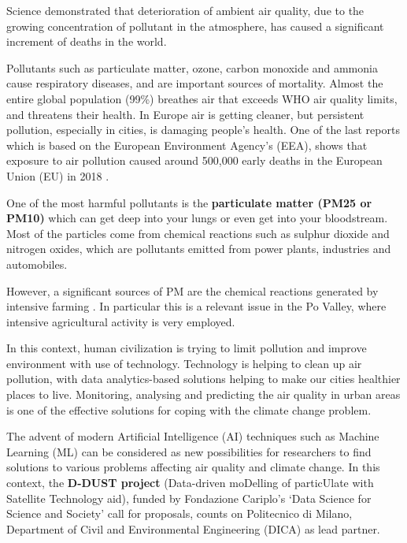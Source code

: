 Science demonstrated that deterioration of ambient air quality, due to the growing concentration of pollutant in the atmosphere, has caused a significant increment of deaths in the world.\par  
Pollutants such as particulate matter, ozone, carbon monoxide and ammonia cause respiratory diseases, and are important sources of mortality.
Almost the entire global population (99\%) breathes air that exceeds WHO air quality limits, and threatens their health.\newline
In Europe air is getting cleaner, but persistent pollution, especially in cities, is damaging people’s health. One of the last reports which is based on the European Environment Agency’s (EEA), shows that exposure to air pollution caused around 500,000 early deaths in the European Union (EU) in 2018 \cite{european2018air}.\par
One of the most harmful pollutants is the \textbf{particulate matter (PM25 or PM10)} which can get deep into your lungs or even get into your bloodstream.\newline
Most of the particles come from chemical reactions such as sulphur dioxide and nitrogen oxides, which are pollutants emitted from power plants, industries and automobiles.\par
However, a significant sources of PM are the chemical reactions generated by intensive farming \cite{burkart2007diffuse}.
In particular this is a relevant issue in the Po Valley, where intensive agricultural activity is very employed.\par
In this context, human civilization is trying to limit pollution and improve environment with use of technology.\newline
Technology is helping to clean up air pollution, with data analytics-based solutions helping to make our cities healthier places to live.\newline
Monitoring, analysing and predicting the air quality in urban areas is one of the effective solutions for coping with the climate change problem.\par
The advent of modern Artificial Intelligence (AI) techniques such as Machine Learning (ML) can be considered as new possibilities for researchers to find solutions to various problems affecting air quality and climate change.
\bigskip
In this context, the \textbf{D-DUST project} (Data-driven moDelling of particUlate with Satellite Technology aid), funded by Fondazione Cariplo’s ‘Data Science for Science and Society’ call for proposals, counts on Politecnico di Milano, Department of Civil and Environmental Engineering (DICA) as lead partner.\newline
